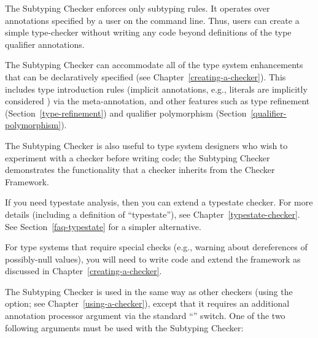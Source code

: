 \htmlhr
{}

The Subtyping Checker enforces only subtyping rules.  It operates over
annotations specified by a user on the command line.  Thus, users can
create a simple type-checker without writing any code beyond definitions of
the type qualifier annotations.

The Subtyping Checker can accommodate all of the type system enhancements that
can be declaratively specified (see Chapter~\ref{creating-a-checker}).
This includes type introduction rules (implicit
annotations, e.g., literals are implicitly considered ) via
the  meta-annotation, and other features such as
type refinement (Section~\ref{type-refinement}) and
qualifier polymorphism (Section~\ref{qualifier-polymorphism}).

The Subtyping Checker is also useful to type system designers who wish to
experiment with a checker before writing code; the Subtyping Checker
demonstrates the functionality that a checker inherits from the Checker
Framework.

If you need typestate analysis, then you can extend a typestate checker.
For more details (including a definition of ``typestate''), see
Chapter~\ref{typestate-checker}.
See Section~\ref{faq-typestate} for a simpler alternative.

For type systems that require special checks (e.g., warning about
dereferences of possibly-null values), you will need to write code and
extend the framework as discussed in Chapter~\ref{creating-a-checker}.



\begin{sloppypar}
The Subtyping Checker is used in the same way as other checkers (using the
 option; see Chapter~\ref{using-a-checker}), except that it
requires an additional annotation processor argument via the standard
``'' switch. One of the two following arguments must be used with the
Subtyping Checker:
\end{sloppypar}

